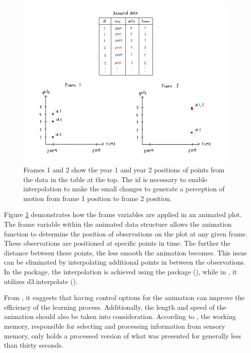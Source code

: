 \begin{figure}

{\centering \includegraphics[width=1\linewidth]{figures/animated-diagram} 

}

\caption{Frames 1 and 2 show the year 1 and year 2 positions of points from the data in the table at the top. The id is necessary to enable interpolation to make the small changes to generate a perception of motion from frame 1 position to frame 2 position.}\label{fig:animated-diagram}
\end{figure}

Figure \ref{fig:animated-diagram} demonstrates how the frame variables are applied in an animated plot. The frame variable within the animated data structure allows the animation function to determine the position of observations on the plot at any given frame. These observations are positioned at specific points in time. The further the distance between these points, the less smooth the animation becomes. This issue can be eliminated by interpolating additional points in between the observations. In the  package, the interpolation is achieved using the  package (\citet{tweenr}), while in , it utilizes d3.interpolate (\citet{d3js}).

From \citet{learner-control}, it suggests that having control options for the animation can improve the efficiency of the learning process. Additionally, the length and speed of the animation should also be taken into consideration. According to \citet{mayer-2010}, the working memory, responsible for selecting and processing information from sensory memory, only holds a processed version of what was presented for generally less than thirty seconds.

